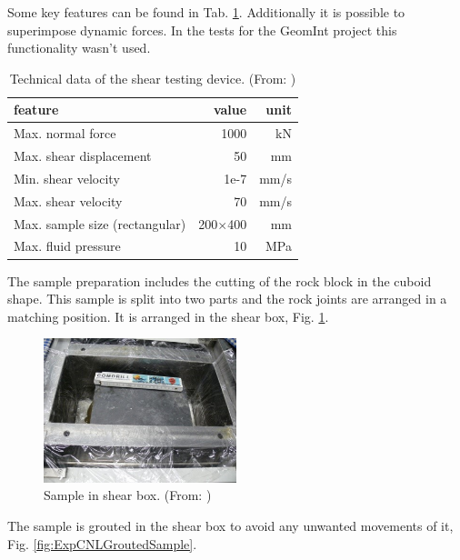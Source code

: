 Some key features can be found in Tab. \ref{table:ExpCNLDeviceTechnicalData}. Additionally it is possible to superimpose dynamic forces. In the tests for the GeomInt project this functionality wasn't used.\\

\begin{table}[!ht]
\begin{center}
\begin{tabular}{l r r}
feature & value & unit\\
\hline
Max. normal force & 1000 & kN\\
Max. shear displacement & 50 &mm\\
Min. shear velocity & 1e-7 & mm/s\\
Max. shear velocity & 70 & mm/s\\
Max. sample size (rectangular) & 200$\times$400 & mm\\
Max. fluid pressure & 10 & MPa\\
\end{tabular}
\caption{Technical data of the shear testing device. (From: \cite{Konietzky2012})}
\label{table:ExpCNLDeviceTechnicalData}
\end{center}
\end{table}

The sample preparation includes the cutting of the rock block in the cuboid shape. This sample is split into two parts and the rock joints are arranged in a matching position. It is arranged in the shear box, Fig. \ref{fig:ExpCNLSampleInShearBox}.\\


\begin{figure}[!ht]
\begin{center}
\includegraphics[width=0.5\textwidth]{./figures/ExpCNLSampleInShearBox.jpg}
\end{center}
\caption{Sample in shear box. (From: \cite{Nguyen2014})}
\label{fig:ExpCNLSampleInShearBox}
\end{figure}

The sample is grouted in the shear box to avoid any unwanted movements of it, Fig. \ref{fig:ExpCNLGroutedSample}.\\


